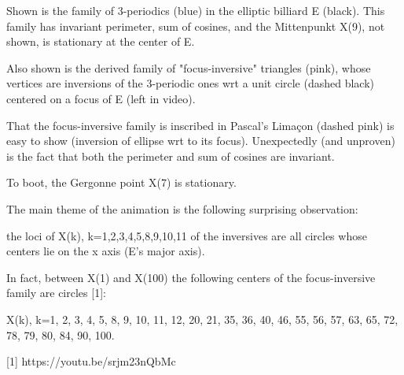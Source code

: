 Shown is the family of 3-periodics (blue) in the elliptic billiard E (black). This family has invariant perimeter, sum of cosines, and the Mittenpunkt X(9), not shown, is stationary at the center of E.

Also shown is the derived family of "focus-inversive" triangles (pink), whose vertices are inversions of the 3-periodic ones wrt a unit circle (dashed black) centered on a focus of E (left in video).

That the focus-inversive family is inscribed in Pascal's Limaçon (dashed pink) is easy to show (inversion of ellipse wrt to its focus). Unexpectedly (and unproven) is the fact that both the perimeter and sum of cosines are invariant.

To boot, the Gergonne point X(7) is stationary.

The main theme of the animation is the following surprising observation:

the loci of X(k), k=1,2,3,4,5,8,9,10,11 of the inversives are all circles whose centers lie on the x axis (E's major axis).

In fact, between X(1) and X(100) the following centers of the focus-inversive family are circles [1]:

X(k), k=1, 2, 3, 4, 5, 8, 9, 10, 11, 12, 20, 21, 35, 36, 40, 46, 55, 56, 57, 63, 65, 72, 78, 79, 80, 84, 90, 100.

[1] https://youtu.be/srjm23nQbMc